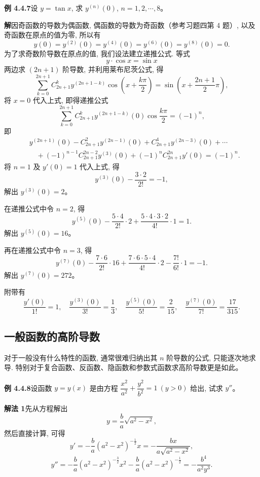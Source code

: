 \documentclass[UTF8, 12pt, fontset=fandol, oneside]{ctexart}
\begin{document}
\noindent\textbf{例 4.4.7}\quad 设 $y=\tan x$, 求 $y^{(n)}(0)$, $n=1,2,\cdots,8$。

\noindent\textbf{解}\quad 因奇函数的导数为偶函数, 偶函数的导数为奇函数（参考习题四第 4 题）, 以及奇函数在原点的值为零, 所以有
\[
  y(0)=y^{(2)}(0)=y^{(4)}(0)=y^{(6)}(0)=y^{(8)}(0)=0.
\]
为了求奇数阶导数在原点的值, 我们设法建立递推公式. 等式
\[
  y\cdot\cos x=\sin x
\]
两边求 $(2n+1)$ 阶导数, 并利用莱布尼茨公式, 得
\[
  \sum_{k=0}^{2n+1}
  C_{2n+1}^ky^{(2n+1-k)}
  \cos\left(x+\frac{k\pi}{2}\right)
  =
  \sin\left(x+\frac{2n+1}{2}\pi\right),
\]
将 $x=0$ 代入上式, 即得递推公式
\[
  \sum_{k=0}^{2n+1}
  C_{2n+1}^ky^{(2n+1-k)}(0)\cos\frac{k\pi}{2}
  =
  (-1)^n,
\]
即
\[
\begin{aligned}
  &y^{(2n+1)}(0)
  -C_{2n+1}^{2}y^{(2n-1)}(0)
  +C_{2n+1}^{4}y^{(2n-3)}(0)+\cdots \\
  &\quad
  +(-1)^{n-1}C_{2n+1}^{2n-2}y^{(3)}(0)
  +(-1)^nC_{2n+1}^{2n}y'(0)
  =
  (-1)^n.
\end{aligned}
\]
将 $n=1$ 及 $y'(0)=1$ 代入上式, 得
\[
  y^{(3)}(0)-\frac{3\cdot2}{2!}=-1,
\]
解出 $y^{(3)}(0)=2$。

在递推公式中令 $n=2$, 得
\[
  y^{(5)}(0)-\frac{5\cdot4}{2!}\cdot2
  +
  \frac{5\cdot4\cdot3\cdot2}{4!}\cdot1
  =
  1.
\]
解出 $y^{(5)}(0)=16$。

再在递推公式中令 $n=3$, 得
\[
  y^{(7)}(0)-\frac{7\cdot6}{2!}\cdot16
  +
  \frac{7\cdot6\cdot5\cdot4}{4!}\cdot2
  -
  \frac{7!}{6!}\cdot1
  =
  -1.
\]
解出 $y^{(7)}(0)=272$。

附带有
\[
  \frac{y'(0)}{1!}=1,\quad
  \frac{y^{(3)}(0)}{3!}=\frac13,\quad
  \frac{y^{(5)}(0)}{5!}=\frac{2}{15},\quad
  \frac{y^{(7)}(0)}{7!}=\frac{17}{315}.
\]

\subsection{一般函数的高阶导数}

对于一般没有什么特性的函数, 通常很难归纳出其 $n$ 阶导数的公式, 只能逐次地求导. 特别对于复合函数、反函数、隐函数和参数式函数求高阶导数更是如此。

\noindent\textbf{例 4.4.8}\quad 设函数 $y=y(x)$ 是由方程 $\dfrac{x^2}{a^2}+\dfrac{y^2}{b^2}=1\ (y>0)$ 给出, 试求 $y''$。

\noindent\textbf{解法 1}\quad 先从方程解出
\[
  y=\frac{b}{a}\sqrt{a^2-x^2},
\]
然后直接计算, 可得
\[
  y'
  =
  -\frac{b}{a}(a^2-x^2)^{-\frac12}x
  =
  -\frac{bx}{a\sqrt{a^2-x^2}},
\]
\[
  y''
  =
  -\frac{b}{a}(a^2-x^2)^{-\frac32}x^2
  -
  \frac{b}{a}(a^2-x^2)^{-\frac12}
  =
  -\frac{b^4}{a^2y^3}.
\]
\end{document}
